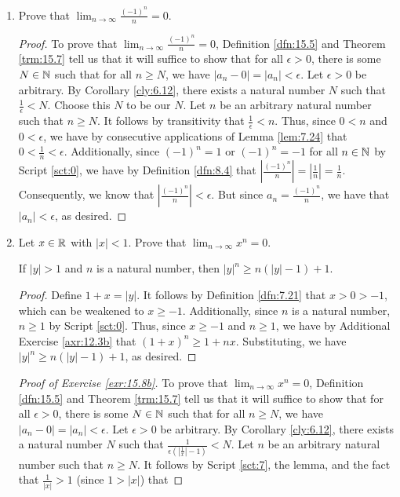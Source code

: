 \documentclass[../main.tex]{subfiles}
\begin{document}
\begin{exercise}\label{exr:15.8}\leavevmode
    \begin{enumerate}[label={(\alph*)},ref={\theexercise\alph*}]
        \item \label{exr:15.8a}Prove that $\lim_{n\to\infty}\frac{(-1)^n}{n}=0$.
        \begin{proof}
            To prove that $\lim_{n\to\infty}\frac{(-1)^n}{n}=0$, Definition \ref{dfn:15.5} and Theorem \ref{trm:15.7} tell us that it will suffice to show that for all $\epsilon>0$, there is some $N\in\mathbb{N}$ such that for all $n\geq N$, we have $|a_n-0|=|a_n|<\epsilon$. Let $\epsilon>0$ be arbitrary. By Corollary \ref{cly:6.12}, there exists a natural number $N$ such that $\frac{1}{\epsilon}<N$. Choose this $N$ to be our $N$. Let $n$ be an arbitrary natural number such that $n\geq N$. It follows by transitivity that $\frac{1}{\epsilon}<n$. Thus, since $0<n$ and $0<\epsilon$, we have by consecutive applications of Lemma \ref{lem:7.24} that $0<\frac{1}{n}<\epsilon$. Additionally, since $(-1)^n=1$ or $(-1)^n=-1$ for all $n\in\mathbb{N}$ by Script \ref{sct:0}, we have by Definition \ref{dfn:8.4} that $|\frac{(-1)^n}{n}|=|\frac{1}{n}|=\frac{1}{n}$. Consequently, we know that $|\frac{(-1)^n}{n}|<\epsilon$. But since $a_n=\frac{(-1)^n}{n}$, we have that $|a_n|<\epsilon$, as desired.
        \end{proof}
        \item \label{exr:15.8b}Let $x\in\mathbb{R}$ with $|x|<1$. Prove that $\lim_{n\to\infty}x^n=0$.
        \begin{lemma*}
            If $|y|>1$ and $n$ is a natural number, then $|y|^n\geq n(|y|-1)+1$.
            \begin{proof}
                Define $1+x=|y|$. It follows by Definition \ref{dfn:7.21} that $x>0>-1$, which can be weakened to $x\geq -1$. Additionally, since $n$ is a natural number, $n\geq 1$ by Script \ref{sct:0}. Thus, since $x\geq -1$ and $n\geq 1$, we have by Additional Exercise \ref{axr:12.3b} that $(1+x)^n\geq 1+nx$. Substituting, we have $|y|^n\geq n(|y|-1)+1$, as desired.
            \end{proof}
        \end{lemma*}
        \begin{proof}[Proof of Exercise \ref{exr:15.8b}]
            To prove that $\lim_{n\to\infty}x^n=0$, Definition \ref{dfn:15.5} and Theorem \ref{trm:15.7} tell us that it will suffice to show that for all $\epsilon>0$, there is some $N\in\mathbb{N}$ such that for all $n\geq N$, we have $|a_n-0|=|a_n|<\epsilon$. Let $\epsilon>0$ be arbitrary. By Corollary \ref{cly:6.12}, there exists a natural number $N$ such that $\frac{1}{\epsilon(|\frac{1}{x}|-1)}<N$. Let $n$ be an arbitrary natural number such that $n\geq N$. It follows by Script \ref{sct:7}, the lemma, and the fact that $\frac{1}{|x|}>1$ (since $1>|x|$) that

\end{proof}
\end{enumerate}
\end{exercise}
\end{document}
